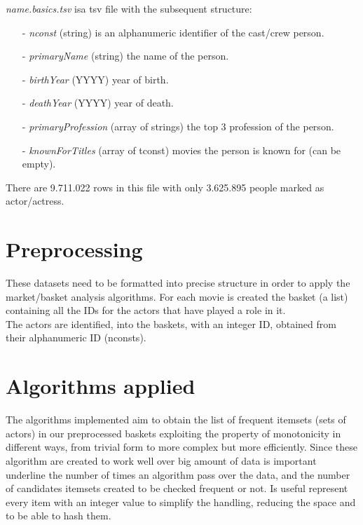 \documentclass[14pt]{extarticle}
\begin{document}
\noindent
{\it name.basics.tsv} isa  tsv file with the subsequent structure:
\begin{itemize}[leftmargin=*]
\vspace{-0.4cm}\item[-]{\it nconst } (string) is an alphanumeric identifier of the cast/crew person.
\vspace{-1.1cm}\item[-]{\it primaryName } (string) the name of the person.
\vspace{-0.4cm}\item[-]{\it birthYear } (YYYY) year of birth.
\vspace{-0.4cm}\item[-]{\it deathYear  } (YYYY) year of death.
\vspace{-0.4cm}\item[-]{\it primaryProfession } (array of strings) the top 3 profession of the person.
\vspace{-1.0cm}\item[-]{\it knownForTitles  } (array of tconst) movies the person is known for (can be empty).
\end{itemize}
There are 9.711.022 rows in this file with only 3.625.895 people marked as actor/actress.
\section{Preprocessing}
These datasets need to be formatted into precise structure in order to apply the market/basket analysis algorithms. For each movie is created the basket (a list) containing all the IDs for the actors that have played a role in it. \\
The actors are identified, into the baskets, with an integer ID, obtained from their alphanumeric ID (nconsts).
\section{Algorithms applied}
The algorithms implemented aim to obtain the list of frequent itemsets (sets of actors) in our preprocessed baskets exploiting the property of monotonicity in different ways, from trivial form to more complex but more efficiently. Since these algorithm are created to work well over big amount of data is important underline the number of times an algorithm pass over the data, and the number of candidates itemsets created to be checked frequent or not. Is useful represent every item with an integer value to simplify the handling, reducing the space and to be able to hash them.\\
\end{document}
